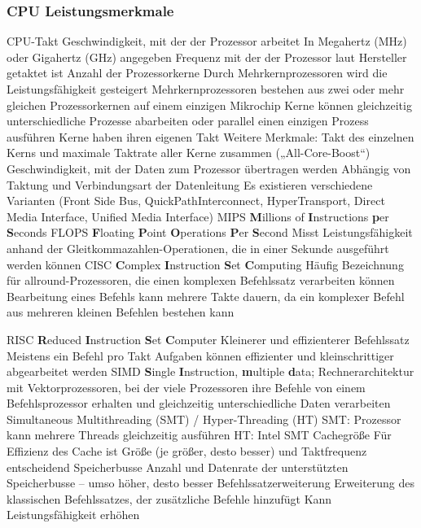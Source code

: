 \documentclass[asp1.tex]{subfiles}
\begin{document}
\subsubsection{CPU Leistungsmerkmale}

\begin{outline}
    \1 CPU-Takt
    \2 Geschwindigkeit, mit der der Prozessor arbeitet
    \2 In Megahertz (MHz) oder Gigahertz (GHz) angegeben
    \2 Frequenz mit der der Prozessor laut Hersteller getaktet ist
    \1 Anzahl der Prozessorkerne
    \2 Durch Mehrkernprozessoren wird die Leistungsfähigkeit gesteigert
    \2 Mehrkernprozessoren bestehen aus zwei oder mehr gleichen Prozessorkernen auf einem einzigen Mikrochip
    \2 Kerne können gleichzeitig unterschiedliche Prozesse abarbeiten oder parallel einen einzigen Prozess ausführen
    \2 Kerne haben ihren eigenen Takt
    \2 \textrightarrow Weitere Merkmale: Takt des einzelnen Kerns und maximale Taktrate aller Kerne zusammen („All-Core-Boost“)
    \1 Geschwindigkeit, mit der Daten zum Prozessor übertragen werden
    \2 Abhängig von Taktung und Verbindungsart der Datenleitung
    \2 Es existieren verschiedene Varianten (Front Side Bus, QuickPathInterconnect, HyperTransport, Direct Media Interface, Unified Media Interface)
    \1 MIPS
    \2 \textbf{M}illions of \textbf{I}nstructions \textbf{p}er \textbf{S}econds
    \1 FLOPS
    \2 \textbf{F}loating \textbf{P}oint \textbf{O}perations \textbf{P}er \textbf{S}econd
    \2 Misst Leistungsfähigkeit anhand der Gleitkommazahlen-Operationen, die in einer Sekunde ausgeführt werden können
    \1 CISC
    \2 \textbf{C}omplex \textbf{I}nstruction \textbf{S}et \textbf{C}omputing
    \2 Häufig Bezeichnung für allround-Prozessoren, die einen komplexen Befehlssatz verarbeiten können
    \2 Bearbeitung eines Befehls kann mehrere Takte dauern, da ein komplexer Befehl aus mehreren kleinen Befehlen bestehen kann

    \break
    \break

    \1 RISC
    \2 \textbf{R}educed \textbf{I}nstruction \textbf{S}et \textbf{C}omputer
    \2 Kleinerer und effizienterer Befehlssatz
    \2 Meistens ein Befehl pro Takt
    \2 Aufgaben können effizienter und kleinschrittiger abgearbeitet werden
    \1 SIMD
    \2 \textbf{S}ingle \textbf{I}nstruction, \textbf{m}ultiple \textbf{d}ata; Rechnerarchitektur mit Vektorprozessoren, bei der viele Prozessoren ihre Befehle von einem Befehlsprozessor erhalten und gleichzeitig unterschiedliche Daten verarbeiten
    \1 Simultaneous Multithreading (SMT) / Hyper-Threading (HT)
    \2 SMT: Prozessor kann mehrere Threads gleichzeitig ausführen
    \2 HT: Intel SMT
    \1 Cachegröße
    \2 Für Effizienz des Cache ist Größe (je größer, desto besser) und Taktfrequenz entscheidend
    \1 Speicherbusse
    \2 Anzahl und Datenrate der unterstützten Speicherbusse – umso höher, desto besser
    \1 Befehlssatzerweiterung
    \2 Erweiterung des klassischen Befehlssatzes, der zusätzliche Befehle hinzufügt
    \2 Kann Leistungsfähigkeit erhöhen
\end{outline}
\end{document}
